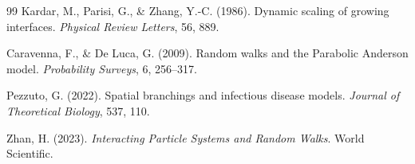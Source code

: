 \begin{thebibliography}{99}
Kardar, M., Parisi, G., \& Zhang, Y.-C. (1986). Dynamic scaling of growing interfaces. \textit{Physical Review Letters}, 56, 889.

Caravenna, F., \& De Luca, G. (2009). Random walks and the Parabolic Anderson model. \textit{Probability Surveys}, 6, 256--317.

Pezzuto, G. (2022). Spatial branchings and infectious disease models. \textit{Journal of Theoretical Biology}, 537, 110.

Zhan, H. (2023). \textit{Interacting Particle Systems and Random Walks}. World Scientific.

\end{thebibliography}
